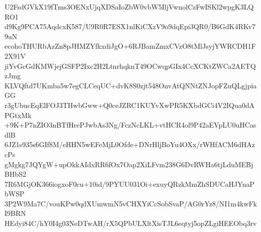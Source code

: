 U2FsdGVkX19fTms3OENxUjqXDSaIoZbW0vbW5IljVwnolCzFwISKl2wpgK3LQRO1
d9Kg9PCA75AqdcxK587/U9R0R7ESX1nlKiCXzV9o9dqEpi3QR0/B6GdK4RKv79uN
ecohoTHURbAzZn8pJHMZYfkxdiJgO+6RJBamZmxCVzO8tMlJsyjYWRCDH1F2X91V
jiYvGcGdKMWjejGSFP2Ixc2H2LtnrhqknT49OCwqpGIx4CcXCKtZWCa2AETQzJmg
KLVQftd7UKmba5w7egCLCeqUC+dvK8S0zjt548OnvAtQNNtZNJopFZuQLgjpiaGG
r3gUbucEqElFOJ3THwbGww+Q0ceJZRC1KUYvXwPR5KXbdGCi4V2IQua0dAPGtxMk
+9K+P7nZIO3nBTfHrePJwbAs3Ng/FczNcLKL+vtHCR4ol9P42aEVpLU0uHCasdlB
6JZ1s935s6GIf8M/eHHN5wEFeMjL0Ofde+DNrHljBoYu4OXx/rWHfACM6dHAzcPs
gMgkg7JQYgW+upOkkAIdxRR6fOx7Oap2XiLFvm238G6DvRWHa6tjLduMEBjBHbS2
7R6MGjOK366iogxoF0cu+10id/9PYUU031Oi+exuyQRzkMmZhSDUCaHJYnaPbWSP
3P2W9Ma7C/vouKPw0qdXUmwmN5vCHXYiCcSobSvaP/AG0rYz8/NI1m4kwFkI9BRN
HEdyi84C/hY0I4g03NeDTwAH/rX5QPbULXltXisTJL6eqtyj5opZLgiHEEObq3rv
